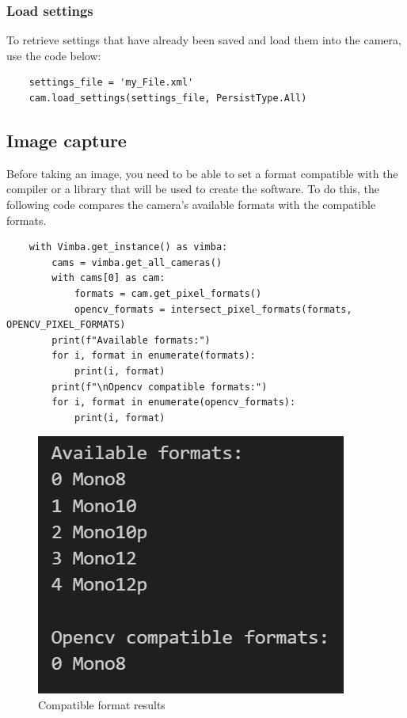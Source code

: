\subsubsection{Load settings}
To retrieve settings that have already been saved and load them into the camera, use the code below:
\begin{verbatim}
    settings_file = 'my_File.xml'
    cam.load_settings(settings_file, PersistType.All)
\end{verbatim}
\newpage
\subsection{Image capture}
Before taking an image, you need to be able to set a format compatible with the compiler or
a library that will be used to create the software. To do this, the following code compares
the camera's available formats with the compatible formats.
\begin{verbatim}
    with Vimba.get_instance() as vimba:
        cams = vimba.get_all_cameras()
        with cams[0] as cam:
            formats = cam.get_pixel_formats()
            opencv_formats = intersect_pixel_formats(formats, OPENCV_PIXEL_FORMATS)
        print(f"Available formats:")
        for i, format in enumerate(formats):
            print(i, format)
        print(f"\nOpencv compatible formats:")
        for i, format in enumerate(opencv_formats):
            print(i, format)
\end{verbatim}
\begin{figure}[H]
    \centering
    \includegraphics[scale=0.85]{assets/figures/Software/Format_Available.png}
    \caption{Compatible format results}
    \label{fig:Soft_Vimba_Format}
\end{figure}
